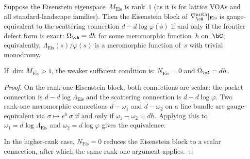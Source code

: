 \begin{proposition}%
\label{prop:gauge-criterion-scattering}%
\ClaimStatusProvedHere%
%
Suppose the Eisenstein eigenspace~$M_{\mathrm{Eis}}$ is
rank~$1$ \textup{(}as it is for lattice VOAs and all
standard-landscape families\textup{)}. Then the Eisenstein
block of $\nabla_\cA^{\mathrm{arith}}|_{\mathrm{Eis}}$ is
gauge-equivalent to the scattering connection
$d - d\log\varphi(s)$ if and only if the frontier defect
form is exact:
$\Omega_\cA = dh$ for some meromorphic function~$h$
on~$\bC$; equivalently,
$\Lambda_{\mathrm{Eis}}(s)/\varphi(s)$
is a meromorphic function of~$s$ with trivial monodromy.

If $\dim M_{\mathrm{Eis}} > 1$, the weaker sufficient
condition is: $N_{\mathrm{Eis}} = 0$ and $\Omega_\cA = dh$.
\end{proposition}

\begin{proof}
On the rank-one Eisenstein block, both connections are
scalar: the packet connection is
$d - d\log\Lambda_{\mathrm{Eis}}$ and the scattering
connection is $d - d\log\varphi$.
Two rank-one meromorphic connections $d - \omega_1$ and
$d - \omega_2$ on a line bundle are gauge-equivalent via
$\sigma \mapsto e^h\,\sigma$ if and only if
$\omega_1 - \omega_2 = dh$. Applying this to
$\omega_1 = d\log\Lambda_{\mathrm{Eis}}$ and
$\omega_2 = d\log\varphi$ gives the equivalence.

In the higher-rank case, $N_{\mathrm{Eis}} = 0$ reduces
the Eisenstein block to a scalar connection, after which
the same rank-one argument applies.
\end{proof}

